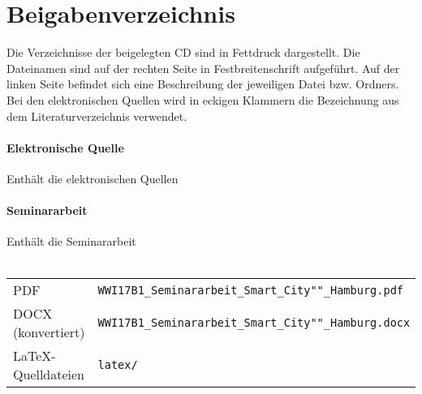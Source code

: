 \section*{Beigabenverzeichnis} 

Die Verzeichnisse der beigelegten CD sind in Fettdruck dargestellt.
Die Dateinamen sind auf der rechten Seite in Festbreitenschrift aufgeführt.
Auf der linken Seite befindet sich eine Beschreibung der jeweiligen Datei bzw. Ordners.
Bei den elektronischen Quellen wird in eckigen Klammern die Bezeichnung aus dem Literaturverzeichnis verwendet.

\paragraph{Elektronische Quelle} Enthält die elektronischen Quellen \\

\paragraph{Seminararbeit} Enthält die Seminararbeit \\\\
\begin{tabular}{>{\raggedleft\arraybackslash}p{4cm}p{8cm}}
	                PDF & \texttt{WWI17B1\_Seminararbeit\_Smart\_City""\_Hamburg.pdf}  \\
	 DOCX (konvertiert) & \texttt{WWI17B1\_Seminararbeit\_Smart\_City""\_Hamburg.docx} \\
	\LaTeX -Quelldateien & \texttt{latex/}
\end{tabular}